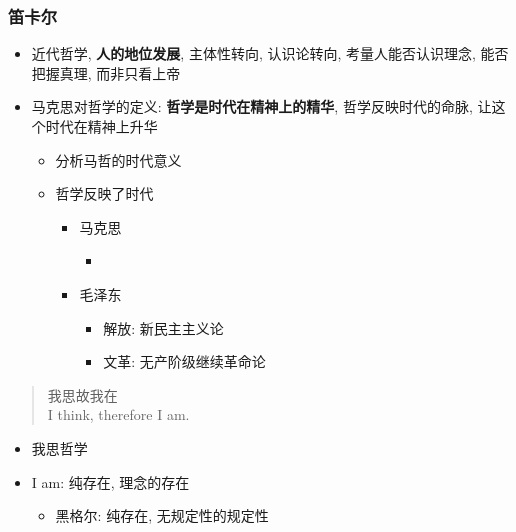 \documentclass[11pt]{article}
\begin{document}
\subsubsection{笛卡尔}
\label{sec:org0a620e5}
\begin{itemize}
\item 近代哲学, \textbf{人的地位发展}, 主体性转向, 认识论转向, 考量人能否认识理念, 能否把握真理, 而非只看上帝
\item 马克思对哲学的定义: \textbf{哲学是时代在精神上的精华}, 哲学反映时代的命脉, 让这个时代在精神上升华
\begin{itemize}
\item 分析马哲的时代意义
\item 哲学反映了时代
\begin{itemize}
\item 马克思
\begin{itemize}
\item 
\end{itemize}
\item 毛泽东
\begin{itemize}
\item 解放: 新民主主义论
\item 文革: 无产阶级继续革命论
\end{itemize}
\end{itemize}
\end{itemize}
\end{itemize}

\begin{quote}
我思故我在 \\
I think, therefore I am.
\end{quote}
\begin{itemize}
\item 我思哲学
\item I am: 纯存在, 理念的存在
\begin{itemize}
\item 黑格尔: 纯存在, 无规定性的规定性
\end{itemize}
\end{itemize}
\end{document}

